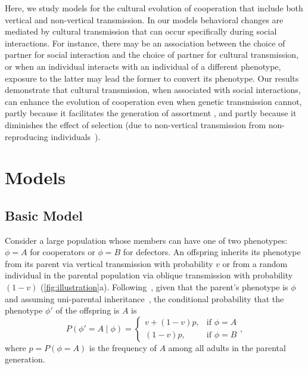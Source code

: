 \documentclass[12pt]{extarticle}
\begin{document}
Here, we study models for the cultural evolution of cooperation that include both vertical and non-vertical transmission. 
In our models behavioral changes are mediated by cultural transmission that can occur specifically during social interactions.
For instance, there may be an association between the choice of partner for social interaction and the choice of partner for cultural transmission,
or when an individual interacts with an individual of a different phenotype,  exposure to the latter may lead the former to  convert its phenotype.
Our results demonstrate that cultural transmission, when associated with social interactions, can enhance the evolution of cooperation even when genetic transmission cannot, partly because it facilitates the generation of assortment \citep{Fletcher2009assortment}, and partly because it diminishes the effect of selection (due to non-vertical transmission from non-reproducing individuals~\citep{ram2018evolution}).

\newpage
\section{Models}

\subsection{Basic Model}
\label{section:basicmodel}
Consider a large population whose members can have one of two phenotypes: $\phi=A$ for cooperators or $\phi=B$ for defectors.
An offspring inherits its phenotype from its parent via vertical transmission with probability $v$ or from a random individual in the parental population via oblique transmission with probability $(1-v)$ (\autoref{fig:illustration}a). 
Following~\citet{ram2018evolution}, given that the parent's phenotype is $\phi$ and assuming uni-parental inheritance~\citep{Zefferman2016}, the conditional probability that the phenotype $\phi'$ of the offspring is $A$ is 
\begin{equation} \label{eq:vertical_oblique_transmission}
P(\phi'=A \mid \phi) = \begin{cases}
v + (1-v)p, & \text{if } \phi=A \\
(1-v)p, & \text{if } \phi=B
\end{cases},
\end{equation}
where $p=P(\phi=A)$ is the frequency of $A$ among all adults in the parental generation.  
\end{document}
